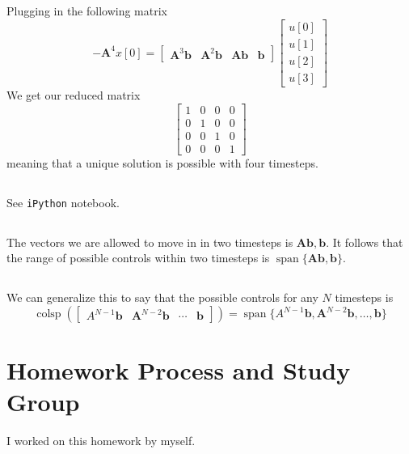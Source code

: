 \documentclass[]{article}
\numberwithin{equation}{section}
\begin{document}
\subsection{}

Plugging in the following matrix 
\begin{equation}
	-\mathbf{A}^4 x[0] = 
	\begin{bmatrix}
	\mathbf{A}^3 \mathbf{b} & \mathbf{A}^2 \mathbf{b} & \mathbf{Ab} & \mathbf{b}
	\end{bmatrix}
	\begin{bmatrix}
	u[0] \\
	u[1] \\
	u[2] \\
	u[3]
	\end{bmatrix}
\end{equation}
We get our reduced matrix
\begin{equation}
	\begin{bmatrix}
		1 & 0 & 0 & 0 \\
		0 & 1 & 0 & 0 \\
		0 & 0 & 1 & 0 \\
		0 & 0 & 0 & 1
	\end{bmatrix}
\end{equation}
meaning that a unique solution is possible with four timesteps. 

\subsection{}

See \texttt{iPython} notebook. 

\subsection{}

The vectors we are allowed to move in in two timesteps is \(\mathbf{Ab}, \mathbf{b}\). It follows that the range of possible controls within two timesteps is \(\operatorname{span}\{\mathbf{Ab},
\mathbf{b}\}\). 

\subsection{}

We can generalize this to say that the possible controls for any \(N\) timesteps is 
\begin{equation}
	\operatorname{colsp}(\begin{bmatrix}
	A^{N - 1} \mathbf{b} & \mathbf{A}^{N - 2} \mathbf{b} & \cdots & \mathbf{b}
	\end{bmatrix}) = \operatorname{span}\{A^{N - 1} \mathbf{b}, \mathbf{A}^{N - 2} \mathbf{b}, \ldots, \mathbf{b}\}
\end{equation}



\section{Homework Process and Study Group}

I worked on this homework by myself. 

\newpage


\end{document}
